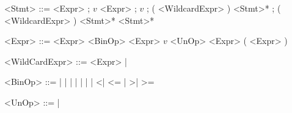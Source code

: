 
\begin{grammar}
	<Stmt> ::=  <Expr> ;
	\alt $v$ \gramr{:=} <Expr> ;
	\alt {} $v$ ;
	\alt {} ( <WildcardExpr> ) <Stmt>* ;
	\alt {} ( <WildcardExpr> ) <Stmt>*  <Stmt>*
	
	<Expr> ::= <Expr> <BinOp> <Expr>
	\alt $v$
	\alt <UnOp> <Expr>
	\alt ( <Expr> )
	\alt {}
	\alt {}
	
	<WildCardExpr> ::= <Expr> | \gramr{*}
	
	<BinOp> ::= \gramr{+} | \gramr{-} | \gramr{$\cdot$} | \gramr{/} | \gramr{\%}
	\alt \gramr{\&\&} | \gramr{||} | \gramr{==} | \gramr{!=}
	\alt \textless | \textless= | \textgreater | \textgreater=
	
	<UnOp> ::= \gramr{-} | \gramr{!}
\end{grammar}